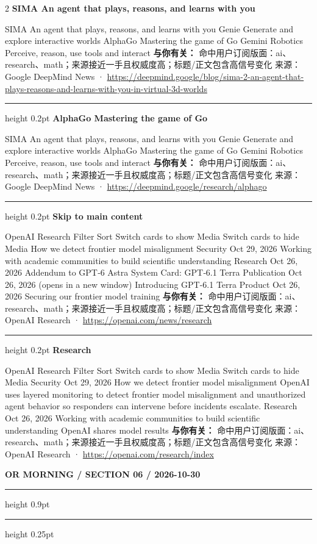 \documentclass[10.5pt]{ctexart}
\begin{document}
\begin{multicols}{2}
{\large\bfseries SIMA An agent that plays, reasons, and learns with you}\par
SIMA An agent that plays, reasons, and learns with you Genie Generate and explore interactive worlds AlphaGo Mastering the game of Go Gemini Robotics Perceive, reason, use tools and interact
\textbf{与你有关：} 命中用户订阅版面：ai、research、math；来源接近一手且权威度高；标题/正文包含高信号变化
{\footnotesize\color{ormuted} 来源：Google DeepMind News · \url{https://deepmind.google/blog/sima-2-an-agent-that-plays-reasons-and-learns-with-you-in-virtual-3d-worlds}}
\vspace{2mm}
\hrule height 0.2pt
\vspace{2mm}
{\large\bfseries AlphaGo Mastering the game of Go}\par
SIMA An agent that plays, reasons, and learns with you Genie Generate and explore interactive worlds AlphaGo Mastering the game of Go Gemini Robotics Perceive, reason, use tools and interact
\textbf{与你有关：} 命中用户订阅版面：ai、research、math；来源接近一手且权威度高；标题/正文包含高信号变化
{\footnotesize\color{ormuted} 来源：Google DeepMind News · \url{https://deepmind.google/research/alphago}}
\vspace{2mm}
\hrule height 0.2pt
\vspace{2mm}
{\large\bfseries Skip to main content}\par
OpenAI Research Filter Sort Switch cards to show Media Switch cards to hide Media How we detect frontier model misalignment Security Oct 29, 2026 Working with academic communities to build scientific understanding Research Oct 26, 2026 Addendum to GPT‑6 Astra System Card: GPT‑6.1 Terra Publication Oct 26, 2026 (opens in a new window) Introducing GPT-6.1 Terra Product Oct 26, 2026 Securing our frontier model training 
\textbf{与你有关：} 命中用户订阅版面：ai、research、math；来源接近一手且权威度高；标题/正文包含高信号变化
{\footnotesize\color{ormuted} 来源：OpenAI Research · \url{https://openai.com/news/research}}
\vspace{2mm}
\hrule height 0.2pt
\vspace{2mm}
{\large\bfseries Research}\par
OpenAI Research Filter Sort Switch cards to show Media Switch cards to hide Media Security Oct 29, 2026 How we detect frontier model misalignment OpenAI uses layered monitoring to detect frontier model misalignment and unauthorized agent behavior so responders can intervene before incidents escalate. Research Oct 26, 2026 Working with academic communities to build scientific understanding OpenAI shares model results 
\textbf{与你有关：} 命中用户订阅版面：ai、research、math；来源接近一手且权威度高；标题/正文包含高信号变化
{\footnotesize\color{ormuted} 来源：OpenAI Research · \url{https://openai.com/research/index}}
\end{multicols}
\newpage
{\small\bfseries OR MORNING / SECTION 06 / 2026-10-30}
\vspace{2mm}
\hrule height 0.9pt
\vspace{1.5mm}
\hrule height 0.25pt
\vspace{4mm}
\end{document}
